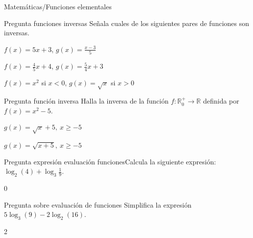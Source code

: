 \documentclass[12pt]{article}
\begin{document}
\begin{quiz}{Matemáticas/Funciones elementales}
 
 \begin{multi}[shuffle=true,numbering=none,
 feedback={Si llamamos $f(x)=5x+3$ tenemos que $f(x)-3=5x$ y dividiendo por $5$ se tiene que $x=\displaystyle \frac{f(x)-3}{5}.$
 }]{Pregunta funciones inversas}
 Señala cuales de los siguientes pares de funciones son inversas.
	\item*  $f(x)=5x+3$, $g(x)=\frac{x-3}{5}$
	\item $f(x)=\frac{4}{5}x+4$, $g(x)= \frac{5}{4}x+3$ 
	\item $f(x)=x^2$ si  $x<0$, $g(x)= \sqrt{x}$ si $x>0$
 \end{multi}
 
 \begin{multi}[shuffle=true,numbering=none]{Pregunta función inversa}
	 Halla la inversa de la función $f:\mathbb{R}^+_0\to \mathbb{R}$ definida por $f(x)=x^2-5$.
	\item $g(x)=\sqrt{x}+5,\ x\ge -5$ 
	\item*  $g(x)=\sqrt{x+5},\ x\ge -5$ 
 \end{multi}
 
 \begin{numerical}[shuffle=true,numbering=none,feedback={
 \[ \log_2(4)+\log_3\frac{1}{9}= \log_2(2^2)+\log_3 3^{-2}=
 2\overbrace{log_2(2)}^{1}-2\overbrace{log_3(3)}^{1}=0.\]
 }]{Pregunta expresión evaluación funciones}Calcula la siguiente expresión: $\displaystyle \log_2(4)+\log_3\frac{1}{9}$.
 
 \item 0 
 \end{numerical}
 
 \begin{numerical}[shuffle=true,numbering=none, feedback={
 \[\begin{aligned} 
 5\log_3(9)-2\log_2(16)  	& = 5\log_3(3^2)-2\log_2 (2^4) \\
 				& =10\overbrace{\log_3(3)}^{1}-8\overbrace{\log_2(2)}^{1}=0.
 \end{aligned}\]}
 ]{Pregunta sobre evaluación de funciones} 
 Simplifica la expresión  $5\log_3(9)-2\log_2(16)$.
 \item 2
 \end{numerical}
 

\end{quiz}
\end{document}
